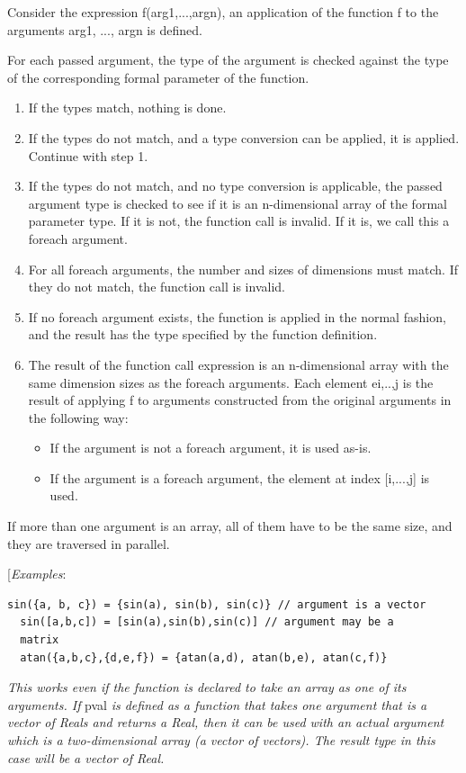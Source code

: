 \documentclass[10pt,a4paper]{report}
\renewcommand{\labelenumi}{\arabic{enumi}.}
\begin{document}
Consider the expression f(arg1,...,argn), an application of the function
f to the arguments arg1, ..., argn is defined.

For each passed argument, the type of the argument is checked against
the type of the corresponding formal parameter of the function.

\begin{enumerate}
\def\labelenumi{\arabic{enumi}.}
\item
  If the types match, nothing is done.
\item
  If the types do not match, and a type conversion can be applied, it is
  applied. Continue with step 1.
\item
  If the types do not match, and no type conversion is applicable, the
  passed argument type is checked to see if it is an n-dimensional array
  of the formal parameter type. If it is not, the function call is
  invalid. If it is, we call this a foreach argument.
\item
  For all foreach arguments, the number and sizes of dimensions must
  match. If they do not match, the function call is invalid.
\item
  If no foreach argument exists, the function is applied in the normal
  fashion, and the result has the type specified by the function
  definition.
\item
  The result of the function call expression is an n-dimensional array
  with the same dimension sizes as the foreach arguments. Each element
  ei,..,j is the result of applying f to arguments constructed from the
  original arguments in the following way:
\begin{itemize}
\item
  If the argument is not a foreach argument, it is used as-is.
\item
  If the argument is a foreach argument, the element at index
  {[}i,...,j{]} is used.
\end{itemize}
\end{enumerate}

If more than one argument is an array, all of them have to be the same
size, and they are traversed in parallel.

{[}\emph{Examples}:

\begin{lstlisting}[language=modelica]
  sin({a, b, c}) = {sin(a), sin(b), sin(c)} // argument is a vector
  sin([a,b,c]) = [sin(a),sin(b),sin(c)] // argument may be a
  matrix
  atan({a,b,c},{d,e,f}) = {atan(a,d), atan(b,e), atan(c,f)}
\end{lstlisting}
\emph{This works even if the function is declared to take an array as
one of its arguments. If} pval \emph{is defined as a function that takes
one argument that is a vector of Reals and returns a Real, then it can
be used with an actual argument which is a two-dimensional array (a
vector of vectors). The result type in this case will be a vector of
Real. }
\end{document}
